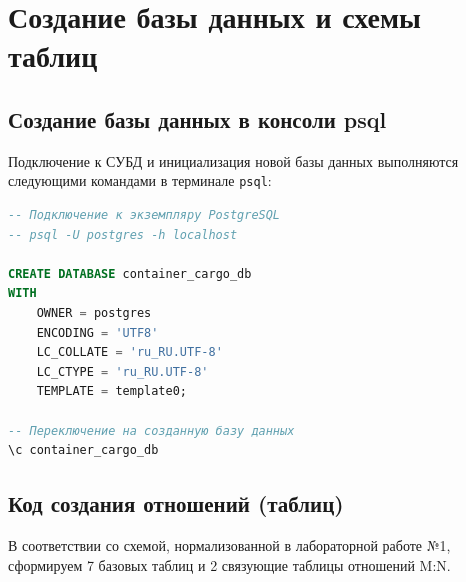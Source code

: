 \documentclass[a4paper,14pt]{article}
\begin{document}
\newpage
\section{Создание базы данных и схемы таблиц}

\subsection{Создание базы данных в консоли psql}
Подключение к СУБД и инициализация новой базы данных выполняются следующими командами в терминале \texttt{psql}:

\begin{lstlisting}[language=SQL]
-- Подключение к экземпляру PostgreSQL
-- psql -U postgres -h localhost

CREATE DATABASE container_cargo_db
WITH 
    OWNER = postgres
    ENCODING = 'UTF8'
    LC_COLLATE = 'ru_RU.UTF-8'
    LC_CTYPE = 'ru_RU.UTF-8'
    TEMPLATE = template0;

-- Переключение на созданную базу данных
\c container_cargo_db
\end{lstlisting}

\subsection{Код создания отношений (таблиц)}
В соответствии со схемой, нормализованной в лабораторной работе №1, сформируем 7 базовых таблиц и 2 связующие таблицы отношений M:N.
\end{document}
